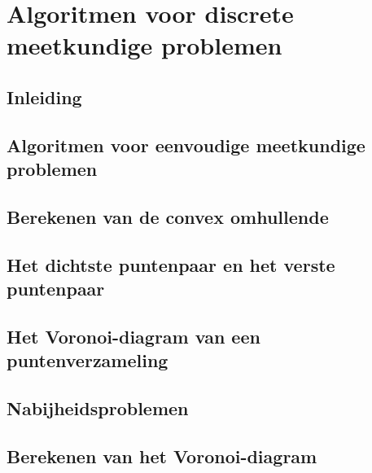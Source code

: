 \documentclass[10pt,a4paper,oneside]{book}
\begin{document}
\part{Algoritmen voor discrete meetkundige problemen}
\chapter{Inleiding}
\chapter{Algoritmen voor eenvoudige meetkundige problemen}
\chapter{Berekenen van de convex omhullende}
\chapter{Het dichtste puntenpaar en het verste puntenpaar}
\chapter{Het Voronoi-diagram van een puntenverzameling}
\chapter{Nabijheidsproblemen}
\chapter{Berekenen van het Voronoi-diagram}
\end{document}
